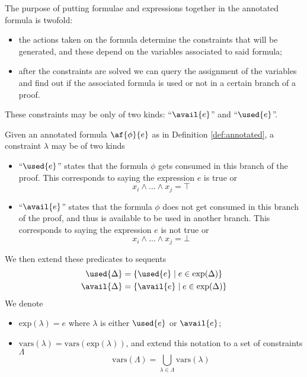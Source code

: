 \noindent The purpose of putting formulae and expressions together in the annotated formula is twofold:
\begin{itemize}
	\item the actions taken on the formula determine the constraints that will be generated, and these depend on the variables associated to said formula;
	\item after the constraints are solved we can query the assignment of the variables and find out if the associated formula is used or not in a certain branch of a proof.
\end{itemize}
These constraints may be only of two kinds: ``$\avail{e}$'' and ``$\used{e}$''.
\begin{define}[Constraints]
	\label{def:constraints}
	Given an annotated formula $\af{\phi}{e}$ as in Definition \ref{def:annotated}, a constraint $\lambda$ may be of two kinds
	\begin{itemize}
		\item ``$\used{e}$'' states that the formula $\phi$ gets consumed in this branch of the proof.
			This corresponds to saying the expression $e$ is true or
			$$ x_i \wedge \dots \wedge x_j = \top $$
		\item ``$\avail{e}$'' states that the formula $\phi$ does not get consumed in this branch of the proof, and thus is available to be used in another branch.
			This corresponds to saying the expression $e$ is not true or
			$$ x_i \wedge \dots \wedge x_j = \bot $$
	\end{itemize}
	We then extend these predicates to sequents
	\begin{align*}
		\used{\Delta} &= \{ \used{e} \mid e \in \mathrm{exp}(\Delta) \} \\
		\avail{\Delta} &= \{ \avail{e} \mid e \in \mathrm{exp}(\Delta) \}
	\end{align*}
	We denote
	\begin{itemize}
		\item $\mathrm{exp}(\lambda) = e$ where $\lambda$ is either $\used{e}$ or $\avail{e}$;
		\item $\mathrm{vars}(\lambda) = \mathrm{vars}(\mathrm{exp}(\lambda))$, and extend this notation to a set of constraints $\Lambda$
			$$ \mathrm{vars}(\Lambda) = \bigcup_{\lambda \in \Lambda} \mathrm{vars}(\lambda) $$
	\end{itemize}
\end{define}
